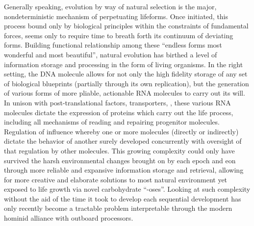 Generally speaking, evolution by way of natural selection is the major, nondeterministic mechanism of perpetuating lifeforms. Once initiated, this process bound only by biological principles within the constraints of fundamental forces, seems only to require time to breath forth its continuum of deviating forms. Building functional relationship among these ``endless forms most wonderful and most beautiful''\citep{darwin1869origin}, natural evolution has birthed a level of information storage and processing in the form of living organisms. In the right setting, the DNA molecule allows for not only the high fidelity storage of any set of biological blueprints (partially through its own replication), but the generation of various forms of more pliable, actionable RNA molecules to carry out its will\citep{roeder1991complexities}. In unison with post-translational factors, transporters, \etc, these various RNA molecules dictate the expression of proteins which carry out the life process, including all mechanisms of reading and repairing progenitor molecules. Regulation of influence whereby one or more molecules (directly or indirectly) dictate the behavior of another surely developed concurrently with oversight of that regulation by other molecules. This growing complexity could only have survived the harsh environmental changes brought on by each epoch and eon through more reliable and expansive information storage and retrieval, allowing for more creative and elaborate solutions to most natural environment yet exposed to life \eg growth via novel carbohydrate ``-oses''. Looking at such complexity without the aid of the time it took to develop each sequential development has only recently become a tractable problem interpretable through the modern hominid alliance with outboard processors.

